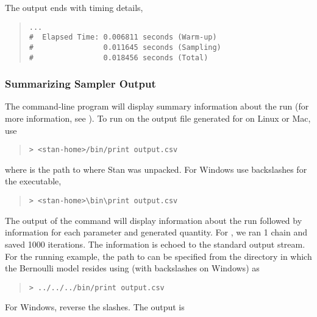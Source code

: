 The output ends with timing details,%
\begin{quote}
\begin{Verbatim}[fontsize=\small]
...
#  Elapsed Time: 0.006811 seconds (Warm-up)
#                0.011645 seconds (Sampling)
#                0.018456 seconds (Total)
\end{Verbatim}
\end{quote}


\subsubsection{Summarizing Sampler Output}

The command-line program  will display summary
information about the run (for more information, see
). To run  on the output file
generated for  on Linux or Mac,  use
%
\begin{quote}
\begin{Verbatim}[fontshape=sl]
> <stan-home>/bin/print output.csv
\end{Verbatim}
\end{quote}
%
where  is the path to where Stan was unpacked.  For
Windows use backslashes for the executable,
%
\begin{quote}
\begin{Verbatim}[fontshape=sl]
> <stan-home>\bin\print output.csv
\end{Verbatim}
\end{quote}
%
The output of the command will display information about the run
followed by information for each parameter and generated quantity. For
, we ran 1 chain and saved 1000 iterations. The
information is echoed to the standard output stream.  For the running
example, the path to  can be specified from the
directory in which the Bernoulli model resides using  (with
backslashes on Windows) as
%
\begin{quote}
\begin{Verbatim}[fontshape=sl]
> ../../../bin/print output.csv 
\end{Verbatim}
\end{quote}
%
For Windows, reverse the slashes.  The output is
%
